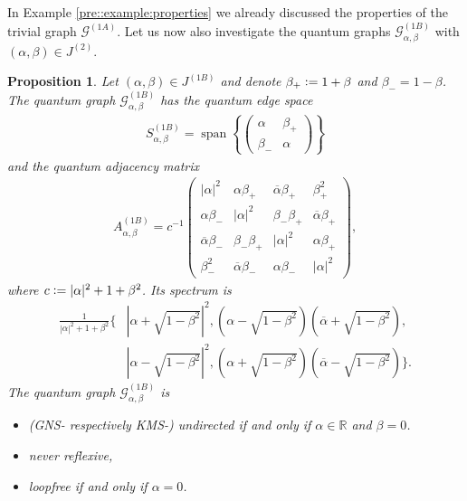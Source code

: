 \documentclass{amsart}
\newtheorem{proposition}[thm]{Proposition}
\newcommand{\R}{\mathbb{R}}
\DeclareMathOperator{\spann}{span}
\begin{document}
In Example \ref{pre::example:properties} we already discussed the properties of the trivial graph $\mathcal{G}^{(1A)}$. Let us now also investigate the quantum graphs $\mathcal{G}_{\alpha, \beta}^{(1B)}$ with $(\alpha,\beta)\in J^{(2)}$. 



\begin{proposition}
    \label{t1e::prop:properties_of_G_alpha,beta^(1B)}
    Let $(\alpha,\beta)\in J^{(1B)}$ and denote $\beta_+\vcentcolon=1+\beta$ and $\beta_-=1-\beta$.
    The quantum graph $\mathcal{G}_{\alpha, \beta}^{(1B)}$ has the quantum edge space
    \begin{align*}
        S_{\alpha,\beta}^{(1B)}=
        \spann\left\{
        \begin{pmatrix}
            \alpha&\beta_+\\ \beta_-&\alpha
        \end{pmatrix}
        \right\}
    \end{align*}
    and the quantum adjacency matrix
    \begin{align*}
        A_{\alpha,\beta}^{(1B)}=
        c^{-1}
        \begin{pmatrix}
            |\alpha|^2&\alpha\beta_+&\overline{\alpha}\beta_+&\beta_+^2\\
            \alpha\beta_-&|\alpha|^2&\beta_-\beta_+&\overline{\alpha}\beta_+\\
            \overline{\alpha}\beta_-&\beta_-\beta_+&|\alpha|^2&\alpha\beta_+\\
            \beta_-^2&\overline{\alpha}\beta_-&\alpha\beta_-&|\alpha|^2
        \end{pmatrix},
    \end{align*}
    where $c\vcentcolon=|\alpha|^2+1+\beta^2$. Its spectrum is
    \begin{align*}
        \frac{1}{|\alpha|^2+1+\beta^2}
        \Big\{
            & \left|\alpha + \sqrt{1-\beta^2}\right|^2,
            \left(\alpha - \sqrt{1-\beta^2}\right)\left(\overline{\alpha} + \sqrt{1-\beta^2}\right), \\
            & \left| \alpha - \sqrt{1-\beta^2} \right|^2, \left(\alpha + \sqrt{1-\beta^2}\right)\left(\overline{\alpha} - \sqrt{1-\beta^2}\right)
        \Big\}.
    \end{align*}
    The quantum graph $\mathcal{G}_{\alpha,\beta}^{(1B)}$ is
    \begin{itemize}
        \item (GNS- respectively KMS-) undirected if and only if $\alpha\in\R$ and $\beta=0$.
        \item never reflexive,
        \item loopfree if and only if $\alpha=0$.
    \end{itemize}
\end{proposition}
\end{document}
